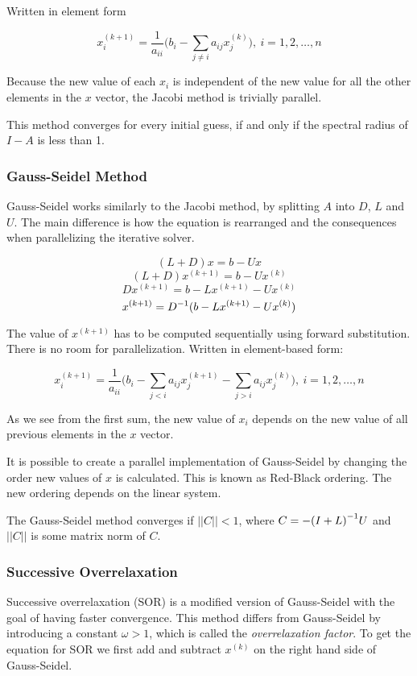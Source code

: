Written in element form

$$ x_i^{(k+1)} = \frac{1}{a_{ii}} \Big( b_i - \sum_{j \neq i} a_{ij} x_j^{(k)} \Big), ~ i = 1, 2, \ldots, n $$

Because the new value of each $x_i$ is independent of the new value for all the 
other elements in the $x$ vector, the Jacobi method is trivially parallel.

This method converges for every initial guess, if and only if the spectral
radius of $I - A$ is less than 1\cite{Kreyszig}.

\subsubsection{Gauss-Seidel Method}

Gauss-Seidel works similarly to the Jacobi method, by splitting $A$ into $D$, 
$L$ and $U$. The main difference is how the equation is rearranged and the consequences 
when parallelizing the iterative solver. 

$$ (L+D)x = b - Ux $$
$$ (L+D)x^{(k+1)} = b - Ux^{(k)} $$
$$ Dx^{(k+1)} = b - Lx^{(k+1)} - Ux^{(k)} $$
$$ x^{(k+1)} = {D}^{-1}(b - Lx^{(k+1)} - Ux^{(k)}) $$

The value of $x^{(k+1)}$ has to be computed sequentially using forward substitution. 
There is no room for parallelization. Written in element-based form:

$$ x_i^{(k+1)} = \frac{1}{a_{ii}} \Big( b_i - \sum_{j < i} a_{ij} x_j^{(k+1)} 
- \sum_{j > i} a_{ij} x_j^{(k)} \Big), ~ i = 1, 2, \ldots, n $$

As we see from the first sum, the new value of $x_i$ depends on the new value of 
all previous elements in the $x$ vector.

It is possible to create a parallel implementation of Gauss-Seidel by changing
the order new values of $x$ is calculated. This is known as Red-Black
ordering. The new ordering depends on the linear system.

The Gauss-Seidel method converges if $||C|| < 1$, where $C = -{(I+L)}^{-1}U$ and 
$||C||$ is some matrix norm of $C$\cite{Kreyszig}.

\subsubsection{Successive Overrelaxation}

Successive overrelaxation (SOR) is a modified version of Gauss-Seidel with the
goal of having faster convergence\cite{Kreyszig}. This method differs from Gauss-Seidel by
introducing a constant $\omega > 1$, which is called the \emph{overrelaxation
factor}. To get the equation for SOR we first add and subtract $x^{(k)}$ on the right 
hand side of Gauss-Seidel.


